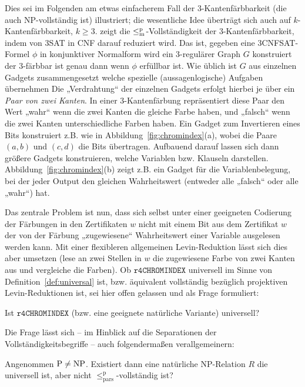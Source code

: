 Dies sei im Folgenden am etwas einfacherem Fall der 3-Kantenfärbbarkeit (die auch NP-vollständig ist) illustriert; die wesentliche Idee überträgt sich auch auf $k$-Kantenfärbbarkeit, $k\geq 3$.
\textcite{holyer_np-completeness_1981} zeigt die $\leq_\mathrm{m}^\mathrm{p}$-Vollständigkeit der 3-Kantenfärbbarkeit, indem von 3SAT in CNF darauf reduziert wird. Das ist, gegeben eine 3CNFSAT-Formel $\phi$ in konjunktiver Normalform wird ein 3-regulärer Graph $G$ konstruiert der 3-färbbar ist genau dann wenn $\phi$ erfüllbar ist. Wie üblich ist $G$ aus einzelnen Gadgets zusammengesetzt welche spezielle (aussagenlogische) Aufgaben übernehmen 
Die „Verdrahtung“ der einzelnen Gadgets erfolgt hierbei je über ein \emph{Paar von zwei Kanten}. In einer 3-Kantenfärbung repräsentiert diese Paar den Wert „wahr“ wenn die zwei Kanten die gleiche Farbe haben, und „falsch“ wenn die zwei Kanten unterschiedliche Farben haben.
Ein Gadget zum Invertieren eines Bits konstruiert \citeauthor{holyer_np-completeness_1981} z.B. wie in Abbildung~\ref{fig:chromindex}(a), wobei die Paare $(a,b)$ und $(c,d)$ die Bits übertragen.
Aufbauend darauf lassen sich dann größere Gadgets konstruieren, welche Variablen bzw. Klauseln darstellen. Abbildung~\ref{fig:chromindex}(b) zeigt z.B. ein Gadget für die Variablenbelegung, bei der jeder Output den gleichen Wahrheitswert (entweder alle „falsch“ oder alle „wahr“) hat.


Das zentrale Problem ist nun, dass sich selbst unter einer geeigneten Codierung der Färbungen in den Zertifikaten $w$ nicht mit einem Bit aus dem Zertifikat $w$ der von der Färbung „zugewiesene“ Wahrheitswert einer Variable ausgelesen werden kann. Mit einer flexibleren allgemeinen Levin-Reduktion lässt sich dies aber umsetzen (lese an zwei Stellen in $w$ die zugewiesene Farbe von zwei Kanten aus und vergleiche die Farben). Ob $\mathtt{r4CHROMINDEX}$ universell im Sinne von Definition~\ref{def:universal} ist, bzw. äquivalent vollständig bezüglich projektiven Levin-Reduktionen ist, sei hier offen gelassen und als Frage formuliert:
\begin{question}\label{question:chromindex}
    Ist $\mathtt{r4CHROMINDEX}$ (bzw. eine geeignete natürliche Variante) universell?
\end{question}
Die Frage lässt sich – im Hinblick auf die Separationen der Vollständigkeitsbegriffe – auch  folgendermaßen verallgemeinern:
\begin{question}
    Angenommen $\mathrm{P}\neq\mathrm{NP}$.
    Existiert dann eine natürliche NP-Relation $R$ die universell ist, aber nicht $\leq_\mathrm{pars}^\mathrm p$-vollständig ist?
\end{question}


